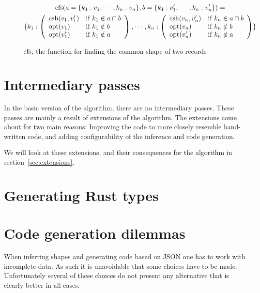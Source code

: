 \begin{figure}[ht!]
\begin{gather*}
\operatorname{cfs}(a = \{ k_1 : v_1, \cdots, k_n : v_n \}, b = \{ k_1 : v'_1, \cdots, k_n : v'_n \}) = \\
\{ k_1 : \left( \begin{array}{ll}
  \operatorname{csh}(v_1, v'_1) & \text{if } k_1 \in a \cap b \\
  \operatorname{opt}(v_1) & \text{if } k_1 \notin b \\
  \operatorname{opt}(v'_1) & \text{if } k_1 \notin a
\end{array}\right), \cdots, k_n : \left( \begin{array}{ll}
  \operatorname{csh}(v_n, v'_n) & \text{if } k_n \in a \cap b \\
  \operatorname{opt}(v_n) & \text{if } k_n \notin b \\
  \operatorname{opt}(v'_n) & \text{if } k_n \notin a
\end{array}\right) \}
\end{gather*}
\caption{$\operatorname{cfs}$, the function for finding the common shape of two records}
\label{fig:ufi}
\end{figure}

\section{Intermediary passes}

In the basic version of the algorithm, there are no intermediary passes. These passes are mainly a result of extensions of the algorithm. The extensions come about for two main reasons: Improving the code to more closely resemble hand-written code, and adding configurability of the inference and code generation.

We will look at these extensions, and their consequences for the algorithm in section~\ref{sec:extensions}.

\section{Generating Rust types}



\section{Code generation dilemmas}
\label{sec:design-considerations}

When inferring shapes and generating code based on JSON one has to work with incomplete data. As such it is unavoidable that some choices have to be made. Unfortunately several of these choices do not present any alternative that is clearly better in all cases.

